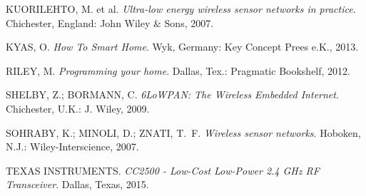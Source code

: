 {KUORILEHTO, M. et al. \emph{Ultra-low energy wireless sensor networks in
  practice}. Chichester, England: John Wiley & Sons, 2007.}

{KYAS, O. \emph{How To Smart Home}. Wyk, Germany: Key Concept Prees e.K.,
  2013.}

{RILEY, M. \emph{Programming your home}. Dallas, Tex.: Pragmatic Bookshelf,
  2012.}

{SHELBY, Z.; BORMANN, C. \emph{6LoWPAN: The Wireless Embedded Internet}.
  Chichester, U.K.: J. Wiley, 2009.}

{SOHRABY, K.; MINOLI, D.; ZNATI, T.~F. \emph{Wireless sensor networks}.
  Hoboken, N.J.: Wiley-Interscience, 2007.}

{TEXAS INSTRUMENTS. \emph{CC2500 - Low-Cost Low-Power 2.4 GHz RF Transceiver}.
Dallas, Texas, 2015.}


